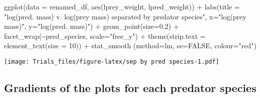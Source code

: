 \documentclass[
]{article}
\newenvironment{Shaded}{\begin{snugshade}}{\end{snugshade}}
\newcommand{\AttributeTok}[1]{\textcolor[rgb]{0.77,0.63,0.00}{#1}}
\newcommand{\ConstantTok}[1]{\textcolor[rgb]{0.00,0.00,0.00}{#1}}
\newcommand{\DecValTok}[1]{\textcolor[rgb]{0.00,0.00,0.81}{#1}}
\newcommand{\FloatTok}[1]{\textcolor[rgb]{0.00,0.00,0.81}{#1}}
\newcommand{\FunctionTok}[1]{\textcolor[rgb]{0.00,0.00,0.00}{#1}}
\newcommand{\NormalTok}[1]{#1}
\newcommand{\SpecialCharTok}[1]{\textcolor[rgb]{0.00,0.00,0.00}{#1}}
\newcommand{\StringTok}[1]{\textcolor[rgb]{0.31,0.60,0.02}{#1}}
\begin{document}
\begin{Shaded}
\begin{Highlighting}[]
\FunctionTok{ggplot}\NormalTok{(}\AttributeTok{data =}\NormalTok{ renamed\_df, }\FunctionTok{aes}\NormalTok{(lprey\_weight, lpred\_weight)) }\SpecialCharTok{+} 
  \FunctionTok{labs}\NormalTok{(}\AttributeTok{title =} \StringTok{"log(pred. mass) v. log(prey mass) separated by predator species"}\NormalTok{, }
       \AttributeTok{x=}\StringTok{"log(prey mass)"}\NormalTok{, }\AttributeTok{y=}\StringTok{"log(pred. mass)"}\NormalTok{) }\SpecialCharTok{+}
  \FunctionTok{geom\_point}\NormalTok{(}\AttributeTok{size=}\FloatTok{0.2}\NormalTok{) }\SpecialCharTok{+} 
  \FunctionTok{facet\_wrap}\NormalTok{(}\SpecialCharTok{\textasciitilde{}}\NormalTok{pred\_species, }\AttributeTok{scale=}\StringTok{"free\_y"}\NormalTok{) }\SpecialCharTok{+} 
  \FunctionTok{theme}\NormalTok{(}\AttributeTok{strip.text =} \FunctionTok{element\_text}\NormalTok{(}\AttributeTok{size =} \DecValTok{10}\NormalTok{)) }\SpecialCharTok{+}
  \FunctionTok{stat\_smooth}\NormalTok{ (}\AttributeTok{method=}\StringTok{\textquotesingle{}lm\textquotesingle{}}\NormalTok{, }\AttributeTok{se=}\ConstantTok{FALSE}\NormalTok{, }\AttributeTok{colour=}\StringTok{"red"}\NormalTok{)}
\end{Highlighting}
\end{Shaded}

\texttt{[image: Trials\_files/figure-latex/sep by pred species-1.pdf]}

\hypertarget{gradients-of-the-plots-for-each-predator-species}{%
\subsection{Gradients of the plots for each predator
species}\label{gradients-of-the-plots-for-each-predator-species}}
\end{document}
